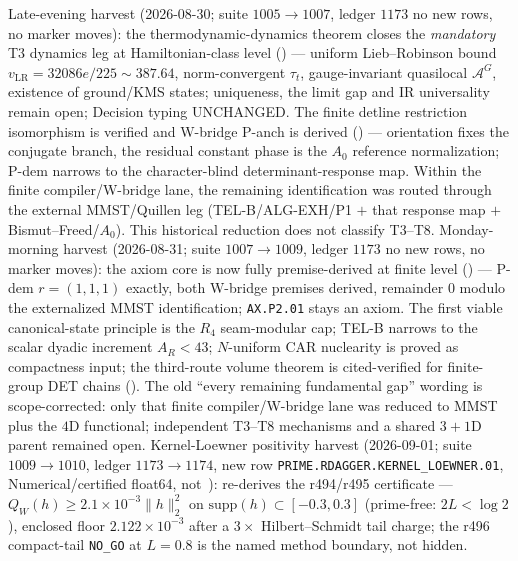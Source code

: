 \documentclass[11pt,a4paper]{article}
\begin{document}
\begin{keybox}
Late-evening harvest (2026-08-30; suite $1005\to1007$, ledger $1173$ no new rows, no marker moves):
the thermodynamic-dynamics theorem closes the \emph{mandatory} T3 dynamics leg at
Hamiltonian-class level
() ---
uniform Lieb--Robinson bound $v_{\mathrm{LR}}=32086e/225\sim387.64$, norm-convergent $\tau_t$,
gauge-invariant quasilocal $\mathcal A^G$, existence of ground/KMS states; uniqueness, the
limit gap and IR universality remain open; Decision typing UNCHANGED.
The finite detline restriction isomorphism is verified and W-bridge P-anch is derived
() ---
orientation fixes the conjugate branch, the residual constant phase is the $A_0$
reference normalization; P-dem narrows to the character-blind determinant-response map.
Within the finite compiler/W-bridge lane, the remaining identification was routed through
the external MMST/Quillen leg (TEL-B/ALG-EXH/P1 $+$ that response map $+$
Bismut--Freed/$A_0$).  This historical reduction does not classify T3--T8.
Monday-morning harvest (2026-08-31; suite $1007\to1009$, ledger $1173$ no new rows, no marker moves):
the axiom core is now fully premise-derived at finite level
() ---
P-dem $r=(1,1,1)$ exactly, both W-bridge premises derived, remainder $0$ modulo the
externalized MMST identification; \texttt{AX.P2.01} stays an axiom.
The first viable canonical-state principle is the $R_4$ seam-modular cap; TEL-B narrows
to the scalar dyadic increment $A_R<43$; $N$-uniform CAR nuclearity is proved as compactness
input; the third-route volume theorem is cited-verified for finite-group DET chains
().
The old ``every remaining fundamental gap'' wording is scope-corrected: only that finite
compiler/W-bridge lane was reduced to MMST plus the $4$D functional; independent T3--T8
mechanisms and a shared $3{+}1$D parent remained open.
Kernel-Loewner positivity harvest (2026-09-01; suite $1009\to1010$, ledger $1173\to1174$,
new row \texttt{PRIME.RDAGGER.KERNEL\_LOEWNER.01}, Numerical/certified float64, not~\mE):
re-derives the r494/r495 certificate --- $Q_W(h)\ge 2.1{\times}10^{-3}\|h\|_2^2$ on
$\mathrm{supp}(h)\subset[-0.3,0.3]$ (prime-free: $2L<\log 2$), enclosed floor
$2.122{\times}10^{-3}$ after a $3\times$ Hilbert--Schmidt tail charge; the r496
compact-tail \texttt{NO\_GO} at $L=0.8$ is the named method boundary, not hidden.

\end{keybox}
\end{document}
